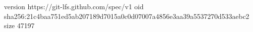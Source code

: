 version https://git-lfs.github.com/spec/v1
oid sha256:21c4baa751ed5ab207189d7015a0c0d07007a4856e3aa39a5537270d533aebc2
size 47197
